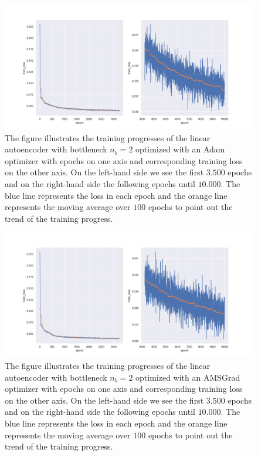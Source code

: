 \begin{figure}
\begin{center}
\includegraphics[width=\linewidth]{linear_AE_2d_adam_training_progress}
\end{center}
\caption{The figure illustrates the training progresses of the linear autoencoder with bottleneck $n_b=2$ optimized with an Adam optimizer with epochs on one axis and corresponding training loss on the other axis. On the left-hand side we see the first $3.500$ epochs and on the right-hand side the following epochs until $10.000$. The blue line represents the loss in each epoch and the orange line represents the moving average over $100$ epochs to point out the trend of the training progress.}\label{fig:linear_AE_2d_adam_training_progress}
\end{figure}


\begin{figure}
\begin{center}
\includegraphics[width=\linewidth]{linear_AE_2d_amsgrad_training_progress}
\end{center}
\caption{The figure illustrates the training progresses of the linear autoencoder with bottleneck $n_b=2$ optimized with an AMSGrad optimizer with epochs on one axis and corresponding training loss on the other axis. On the left-hand side we see the first $3.500$ epochs and on the right-hand side the following epochs until $10.000$. The blue line represents the loss in each epoch and the orange line represents the moving average over $100$ epochs to point out the trend of the training progress.}\label{fig:linear_AE_2d_amsgrad_training_progress}
\end{figure}


